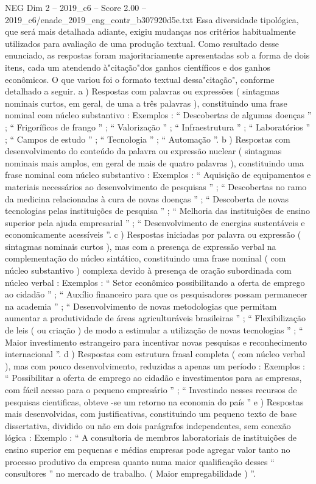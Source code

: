 \begin{textsample}{NEG Dim 2 – 2019\_c6 – Score 2.00 – 2019\_c6/enade\_2019\_eng\_contr\_b307920d5e.txt}
Essa diversidade tipológica, que será mais detalhada adiante, exigiu mudanças nos critérios habitualmente utilizados para avaliação de uma produção textual.
Como resultado desse enunciado, as respostas foram majoritariamente apresentadas sob a forma de dois itens, cada um atendendo à"citação"dos ganhos científicos e dos ganhos econômicos.
O que variou foi o formato textual dessa"citação", conforme detalhado a seguir. a ) Respostas com palavras ou expressões ( sintagmas nominais curtos, em geral, de uma a três palavras ), constituindo uma frase nominal com núcleo substantivo : Exemplos : “ Descobertas de algumas doenças ” ; “ Frigoríficos de frango ” ; “ Valorização ” ; “ Infraestrutura ” ; “ Laboratórios ” ; “ Campos de estudo ” ; “ Tecnologia ” ; “ Automação ”. b ) Respostas com desenvolvimento do conteúdo da palavra ou expressão nuclear ( sintagmas nominais mais amplos, em geral de mais de quatro palavras ), constituindo uma frase nominal com núcleo substantivo : Exemplos : “ Aquisição de equipamentos e materiais necessários ao desenvolvimento de pesquisas ” ; “ Descobertas no ramo da medicina relacionadas à cura de novas doenças ” ; “ Descoberta de novas tecnologias pelas instituições de pesquisa ” ; “ Melhoria das instituições de ensino superior pela ajuda empresarial ” ; “ Desenvolvimento de energias sustentáveis e economicamente acessíveis ”. c ) Respostas iniciadas por palavra ou expressão ( sintagmas nominais curtos ), mas com a presença de expressão verbal na complementação do núcleo sintático, constituindo uma frase nominal ( com núcleo substantivo ) complexa devido à presença de oração subordinada com núcleo verbal : Exemplos : “ Setor econômico possibilitando a oferta de emprego ao cidadão ” ; “ Auxílio financeiro para que os pesquisadores possam permanecer na academia ” ; “ Desenvolvimento de novas metodologias que permitam aumentar a produtividade de áreas agriculturáveis brasileiras ” ; “ Flexibilização de leis ( ou criação ) de modo a estimular a utilização de novas tecnologias ” ; “ Maior investimento estrangeiro para incentivar novas pesquisas e reconhecimento internacional ”. d ) Respostas com estrutura frasal completa ( com núcleo verbal ), mas com pouco desenvolvimento, reduzidas a apenas um período : Exemplos : “ Possibilitar a oferta de emprego ao cidadão e investimentos para as empresas, com fácil acesso para o pequeno empresário ” ; “ Investindo nesses recursos de pesquisas cientificas, obteve -se um retorno na economia do país ” e ) Respostas mais desenvolvidas, com justificativas, constituindo um pequeno texto de base dissertativa, dividido ou não em dois parágrafos independentes, sem conexão lógica : Exemplo : “ A consultoria de membros laboratoriais de instituições de ensino superior em pequenas e médias empresas pode agregar valor tanto no processo produtivo da empresa quanto numa maior qualificação desses “ consultores ” no mercado de trabalho. ( Maior empregabilidade ) ”.

\end{textsample}
